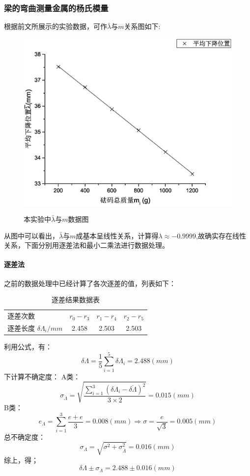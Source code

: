 \documentclass{ctexart}
\begin{document}
\subsubsection{梁的弯曲测量金属的杨氏模量}
根据前文所展示的实验数据，可作$\bar{\lambda}$与$m$关系图如下:
\begin{figure}[H]
  \centering
  \caption{本实验中$\bar{\lambda}$与$m$数据图}
  \includegraphics[width=\textwidth]{3}
  \label{fig:digit}
\end{figure}
从图中可以看出，$\bar{\lambda}$与$m$成基本呈线性关系，计算得$\lambda \approx -0.9999$,故确实存在线性关系，下面分别用逐差法和最小二乘法进行数据处理。
\paragraph{逐差法}之前的数据处理中已经计算了各次逐差的值，列表如下：
\begin{table}[H]
  \centering
  \caption{逐差结果数据表}
    \begin{tabular}{lccc}
    逐差次数  & \multicolumn{1}{l}{$r_0-r_3$} & \multicolumn{1}{l}{$r_1-r_4$} & \multicolumn{1}{l}{$r_2-r_5$} \\
    逐差长度 $\delta \Lambda_i /mm$ & 2.458  & 2.503  & 2.503  \\
    \end{tabular}%
  \label{tab:addlabel}%
\end{table}%

利用公式，有：
$$\delta \Lambda=\frac{1}5 \sum_{i=1}^5{\delta \Lambda_i}=2.488(mm)$$
下计算不确定度：
A类：$$\sigma_{\bar{\Lambda}}=\sqrt{\frac{\sum\limits_{i=1}^3{(\delta \Lambda_i-\overline{\delta \Lambda})^2}}{3\times2}}=0.015(mm)$$
B类：$$e_\Lambda=\sum\limits_{i=1}^3{\frac{e+e}3}=0.008(mm)\Rightarrow \sigma=\frac{e}{\sqrt{3}}=0.005(mm)$$
总不确定度：$$\sigma_\Lambda=\sqrt{\sigma^2+\sigma_{\bar{\Lambda}}^2}=0.016(mm)$$
综上，得；$$\delta \Lambda \pm \sigma_\Lambda=2.488\pm 0.016(mm)$$
\end{document}
